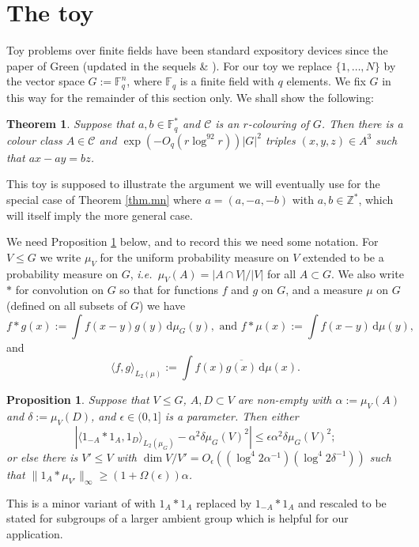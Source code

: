 \documentclass[12pt,reqno]{amsart}
\newtheorem{theorem}[subsection]{Theorem}
\newtheorem{proposition}[subsection]{Proposition}
\providecommand{\Z}{\mathbb{Z}}
\providecommand{\F}{\mathbb{F}}
\newcommand{\dd}{\,\mathrm{d}}
\numberwithin{equation}{section}
\begin{document}
\section{The toy}\label{sec.model}

Toy problems over finite fields have been standard expository devices since the paper of Green \cite{gre::9} (updated in the sequels \cite{wol::3} \& \cite{Peluse:2024aa}). For our toy we replace $\{1,\dots,N\}$ by the vector space $G:=\F_q^n$, where $\F_q$ is a finite field with $q$ elements. We fix $G$ in this way for the remainder of this section only. We shall show the following:
\begin{theorem}\label{thm.model}
Suppose that $a,b \in \F_q^*$ and $\mathcal{C}$ is an $r$-colouring of $G$. Then there is a colour class $A \in \mathcal{C}$ and $\exp(-O_q(r\log^92r)) |G|^2$ triples $(x,y,z) \in A^3$ such that $ax-ay = bz$.
\end{theorem}
This toy is supposed to illustrate the argument we will eventually use for the special case of Theorem \ref{thm.mn} where $a=(a,-a,-b)$ with $a,b \in \Z^*$, which will itself imply the more general case.

We need Proposition \ref{prop.sum} below, and to record this we need some notation. For $V \leq G$ we write $\mu_V$ for the uniform probability measure on $V$ extended to be a probability measure on $G$, \emph{i.e.\ }$\mu_V(A)=|A \cap V|/|V|$ for all $A \subset G$. We also write $\ast$ for convolution on $G$ so that for functions $f$ and $g$ on $G$, and a measure $\mu$ on $G$ (defined on all subsets of $G$) we have
\begin{equation}\label{eqn.earlier}
f \ast g(x):=\int{f(x-y)g(y)\dd\mu_G(y)}, \text{ and } f \ast \mu(x):=\int{f(x-y)\dd\mu(y)},
\end{equation}
and
\begin{equation}\label{eqn.inner}
\langle f,g\rangle_{L_2(\mu)}:=\int{f(x)\overline{g(x)}\dd\mu(x)}.
\end{equation}

\begin{proposition}\label{prop.sum} Suppose that $V \leq G$, $A,D \subset V$ are non-empty with $\alpha:=\mu_V(A)$ and $\delta:=\mu_V(D)$, and $\epsilon \in (0,1]$ is a parameter. Then either
\begin{equation*}
|\langle 1_{-A}  \ast  1_{A}, 1_D\rangle_{L_2(\mu_G)}-\alpha^2\delta\mu_G(V)^2| \leq \epsilon \alpha^2\delta\mu_G(V)^2; 
\end{equation*}
 or else there is $V' \leq V$ with $\dim V/V' = O_\epsilon((\log^4 2\alpha^{-1})(\log^4 2\delta^{-1}))$ such that $\|1_A \ast \mu_{V'}\|_\infty \geq (1+\Omega(\epsilon))\alpha$.
\end{proposition}
This is a minor variant of \cite[Proposition 13, p32]{Bloom:2023aa} with $1_A \ast 1_A$ replaced by $1_{-A} \ast 1_{A}$ and rescaled to be stated for subgroups of a larger ambient group which is helpful for our application. 
\end{document}
